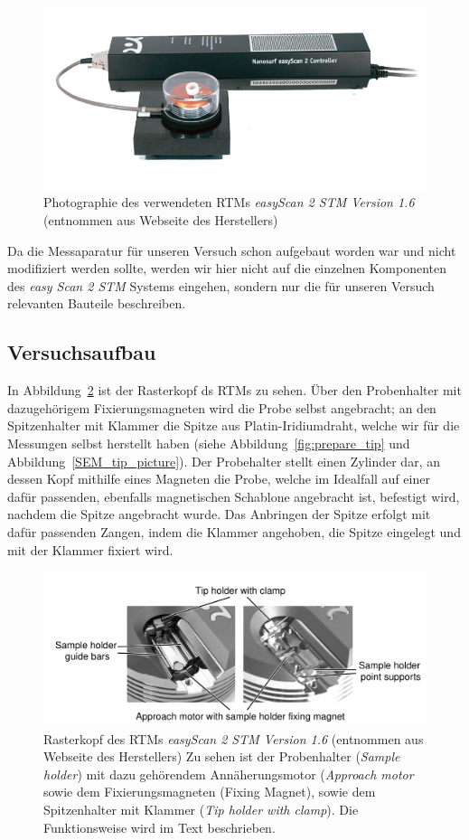 \begin{figure}
\includegraphics[width=14cm]{pics/stm1}
\caption{Photographie des verwendeten RTMs \textit{easyScan 2
STM Version 1.6} (entnommen aus Webseite des Herstellers)} 
 \label{fig:stm1}
\end{figure}

Da die Messaparatur für unseren Versuch schon aufgebaut worden
war und nicht modifiziert werden sollte, werden wir hier nicht
auf die einzelnen Komponenten des \textit{easy Scan 2 STM} Systems
eingehen, sondern nur die für unseren Versuch relevanten 
Bauteile beschreiben.
\subsection{Versuchsaufbau}
In Abbildung~\ref{fig:Rasterkopf} ist der Rasterkopf ds RTMs zu
sehen. Über den Probenhalter mit dazugehörigem Fixierungsmagneten
wird die Probe selbst angebracht; an den Spitzenhalter mit
Klammer die Spitze aus Platin-Iridiumdraht, 
welche wir für die Messungen selbst herstellt haben (siehe
Abbildung~\ref{fig:prepare_tip} und Abbildung~\ref{SEM_tip_picture}).
Der Probehalter stellt einen Zylinder dar, an dessen Kopf mithilfe
eines Magneten die Probe, welche im Idealfall auf einer dafür
passenden, ebenfalls magnetischen Schablone angebracht ist, 
befestigt wird, nachdem die Spitze angebracht wurde. 
Das Anbringen der Spitze erfolgt mit dafür passenden Zangen,
indem die Klammer angehoben, die Spitze eingelegt und mit
der Klammer fixiert wird.

\begin{figure}
\includegraphics[width=14cm]{pics/rasterkopf}
\caption{Rasterkopf des RTMs \textit{easyScan 2
STM Version 1.6} (entnommen aus Webseite des Herstellers)
Zu sehen ist der Probenhalter (\textit{Sample holder}) mit dazu
gehörendem Annäherungsmotor (\textit{Approach motor} sowie
dem Fixierungsmagneten ({Fixing Magnet}), sowie dem Spitzenhalter
mit Klammer (\textit{Tip holder with clamp}). Die Funktionsweise
wird im Text beschrieben.}
 \label{fig:Rasterkopf}
\end{figure}


